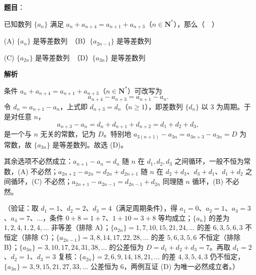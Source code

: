 \begin{answer}

\textbf{题目}：

已知数列 \(\{a_{n}\}\) 满足 \(a_{n}+a_{n+4}=a_{n+1}+a_{n+3}\)（\(n\in\mathbf{N}^{*}\)），那么（　）

(A) \(\{a_{n}\}\) 是等差数列　（B）\(\{a_{2n-1}\}\) 是等差数列

(C) \(\{a_{2n}\}\) 是等差数列　（D）\(\{a_{3n}\}\) 是等差数列

\textbf{解析}

条件 \(a_{n}+a_{n+4}=a_{n+1}+a_{n+3}\)（\(n\in\mathbf{N}^{*}\)）可改写为
\nopagebreak[4]
\[
a_{n+4}-a_{n+3}=a_{n+1}-a_{n}.
\]
令 \(d_{n}=a_{n+1}-a_{n}\)，上式即 \(d_{n+3}=d_{n}\)（\(n\geqslant1\)），即差数列 \(\{d_{n}\}\) 以 \(3\) 为周期。于是对任意 \(n\)，
\nopagebreak[4]
\[
a_{n+3}-a_{n}=d_{n}+d_{n+1}+d_{n+2}=d_{1}+d_{2}+d_{3},
\]
是一个与 \(n\) 无关的常数，记为 \(D\)。特别地 \(a_{3(n+1)}-a_{3n}=a_{3n+3}-a_{3n}=D\) 为常数，故 \(\{a_{3n}\}\) 是等差数列。故选 (D)。

其余选项不必然成立：\(a_{n+1}-a_{n}=d_{n}\) 随 \(n\) 在 \(d_{1},d_{2},d_{3}\) 之间循环，一般不恒为常数，(A) 不必然；\(a_{2n+2}-a_{2n}=d_{2n}+d_{2n+1}\) 随 \(n\) 在 \(d_{2}+d_{3}\)、\(d_{3}+d_{1}\)、\(d_{1}+d_{2}\) 之间循环，(C) 不必然；\(a_{2n+1}-a_{2n-1}=d_{2n-1}+d_{2n}\) 同理随 \(n\) 循环，(B) 不必然。

（验证：取 \(d_{1}=1\)、\(d_{2}=2\)、\(d_{3}=4\)（满足周期条件），得 \(a_{1}=0\)、\(a_{2}=1\)、\(a_{3}=3\)、\(a_{4}=7\)、\(\ldots\)，条件 \(0+8=1+7\)、\(1+10=3+8\) 等均成立；\(\{a_{n}\}\) 的差为 \(1,2,4,1,2,4,\ldots\) 非等差（排除 A）；\(\{a_{2n}\}=1,7,10,15,21,24,\ldots\) 的差 \(6,3,5,6,3\) 不恒定（排除 C）；\(\{a_{2n-1}\}=3,8,14,17,22,28,\ldots\) 的差 \(5,6,3,5,6\) 不恒定（排除 B）；\(\{a_{3n}\}=3,10,17,24,31,38,\ldots\) 的公差恒为 \(D=d_{1}+d_{2}+d_{3}=7\)。再取 \(d_{1}=2\)、\(d_{2}=1\)、\(d_{3}=3\) 复核：\(\{a_{2n}\}=2,6,9,14,18,21,\ldots\) 的差 \(4,3,5,4,3\) 仍不恒定，\(\{a_{3n}\}=3,9,15,21,27,33,\ldots\) 公差恒为 \(6\)，两例互证 (D) 为唯一必然成立者。）


\end{answer}
